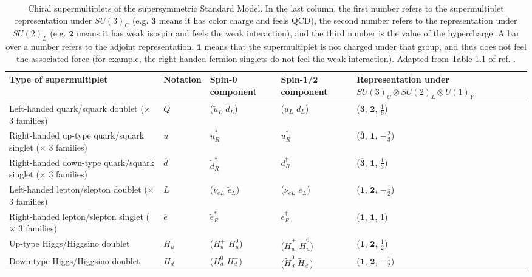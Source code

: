 \documentclass[dissertation.tex]{subfiles}
\begin{document}
\begin{table}[htbp]
\caption{Chiral supermultiplets of the supersymmetric Standard Model.  In the last column, the first number refers to the supermultiplet representation under $SU(3)_{C}$ (e.g. $\mathbf{3}$ means it has color charge and feels QCD), the second number refers to the representation under $SU(2)_{L}$ (e.g. $\mathbf{2}$ means it has weak isospin and feels the weak interaction), and the third number is the value of the hypercharge.  A bar over a number refers to the adjoint representation.  $\mathbf{1}$ means that the supermultiplet is not charged under that group, and thus does not feel the associated force (for example, the right-handed fermion singlets do not feel the weak interaction).  Adapted from Table 1.1 of ref. \cite{SUSY_primer}.}
\begin{tabular}{|m{3cm}|m{2cm}|m{2cm}|m{2cm}|m{4cm}|}
\hline
Type of \newline supermultiplet & Notation & Spin-0 component & Spin-1/2 component & Representation under $SU(3)_{C} \otimes SU(2)_{L} \otimes U(1)_{Y}$ \\
\hline
\hline
Left-handed quark/squark doublet ($\times$ 3 families) & $Q$ & ($\widetilde{u}_{L}$ $\widetilde{d}_{L}$) & ($u_{L}$ $d_{L}$) & ($\mathbf{3}$, $\mathbf{2}$, $\frac{1}{6}$) \\
\hline
Right-handed up-type quark/squark singlet ($\times$ 3 families) & $\overline{u}$ & $\widetilde{u}_{R}^{*}$ & $u_{R}^{\dag}$ & ($\mathbf{\overline{3}}$, $\mathbf{1}$, $-\frac{2}{3}$) \\
\hline
Right-handed down-type quark/squark singlet ($\times$ 3 families) & $\overline{d}$ & $\widetilde{d}_{R}^{*}$ & $d_{R}^{\dag}$ & ($\mathbf{\overline{3}}$, $\mathbf{1}$, $\frac{1}{3}$) \\
\hline
Left-handed lepton/slepton doublet ($\times$ 3 families) & $L$ & ($\widetilde{\overline{\nu}}_{eL}$ $\widetilde{e}_{L}$) & ($\overline{\nu}_{eL}$ $e_{L}$) & ($\mathbf{1}$, $\mathbf{2}$, $-\frac{1}{2}$) \\
\hline
Right-handed lepton/slepton singlet ($\times$ 3 families) & $\overline{e}$ & $\widetilde{e}_{R}^{*}$ & $e_{R}^{\dag}$ & ($\mathbf{\overline{1}}$, $\mathbf{1}$, 1) \\
\hline
Up-type Higgs/Higgsino doublet & $H_{u}$ & ($H_{u}^{+}$ $H_{u}^{0}$) & ($\widetilde{H}_{u}^{+}$ $\widetilde{H}_{u}^{0}$) & ($\mathbf{1}$, $\mathbf{2}$, $\frac{1}{2}$) \\
\hline
Down-type Higgs/Higgsino doublet & $H_{d}$ & ($H_{d}^{0}$ $H_{d}^{-}$) & ($\widetilde{H}_{d}^{0}$ $\widetilde{H}_{d}^{-}$) & ($\mathbf{1}$, $\mathbf{2}$, $-\frac{1}{2}$) \\
\hline
\end{tabular}
\label{tab:chiral_supermultiplets}
\end{table}
\end{document}
